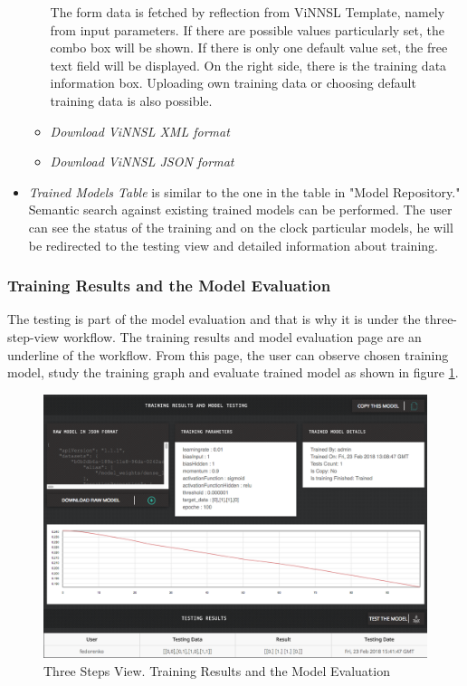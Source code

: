 \begin{itemize}
\begin{itemize}
The form data is fetched by reflection from ViNNSL Template, namely from input parameters. If there are possible values particularly set, the combo box will be shown. If there is only one default value set, the free text field will be displayed.  On the right side, there is the training data information box. Uploading own training data or choosing default training data is also possible.

\item \emph{Download ViNNSL XML format}
\item \emph{Download ViNNSL JSON format}
\end{itemize}

\item \emph{Trained Models Table} is similar to the one in the table in "Model Repository." Semantic search against existing trained models can be performed. The user can see the status of the training and on the clock particular models, he will be redirected to the testing view and detailed information about training.

\end{itemize}

\subsubsection{Training Results and the Model Evaluation}\label{Training results and the model evaluation}

The testing is part of the model evaluation and that is why it is under the three-step-view workflow. The training results and model evaluation page are an underline of the workflow. From this page, the user can observe chosen training model, study the training graph and evaluate trained model as shown in figure \ref{fig:testing_model}.

\begin{figure}[htbp]
\begin{center}
  \includegraphics[width=\linewidth]{components/5/img/testing_model.png}
  \caption{Three Steps View. Training Results and the Model Evaluation}
  \label{fig:testing_model}
\end{center}
\end{figure}

